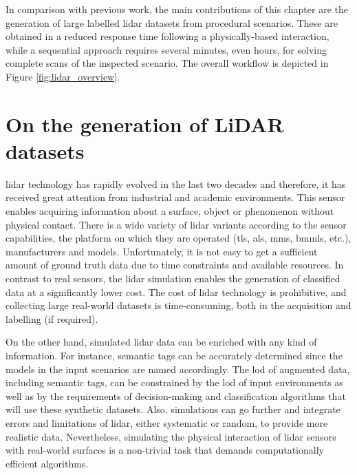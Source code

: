 In comparison with previous work, the main contributions of this chapter are the generation of large labelled \acrshort{lidar} datasets from procedural scenarios. These are obtained in a reduced response time following a physically-based interaction, while a sequential approach requires several minutes, even hours, for solving complete scans of the inspected scenario. The overall workflow is depicted in Figure \ref{fig:lidar_overview}. 

\section{On the generation of LiDAR datasets}

\acrshort{lidar} technology has rapidly evolved in the last two decades and therefore, it has received great attention from industrial and academic environments. This sensor enables acquiring information about a surface, object or phenomenon without physical contact. There is a wide variety of \acrshort{lidar} variants according to the sensor capabilities, the platform on which they are operated (\acrshort{tls}, \acrshort{als}, \acrshort{mms}, \acrshort{bmmls}, etc.), manufacturers and models. Unfortunately, it is not easy to get a sufficient amount of ground truth data due to time constraints and available resources. In contrast to real sensors, the \acrshort{lidar} simulation enables the generation of classified data at a significantly lower cost. The cost of \acrshort{lidar} technology is prohibitive, and collecting large real-world datasets is time-consuming, both in the acquisition and labelling (if required). 

On the other hand, simulated \acrshort{lidar} data can be enriched with any kind of information. For instance, semantic tags can be accurately determined since the models in the input scenarios are named accordingly. The \acrshort{lod} of augmented data, including semantic tags, can be constrained by the \acrshort{lod} of input environments as well as by the requirements of decision-making and classification algorithms that will use these synthetic datasets. Also, simulations can go further and integrate errors and limitations of \acrshort{lidar}, either systematic or random, to provide more realistic data. Nevertheless, simulating the physical interaction of \acrshort{lidar} sensors with real-world surfaces is a non-trivial task that demands computationally efficient algorithms. 

